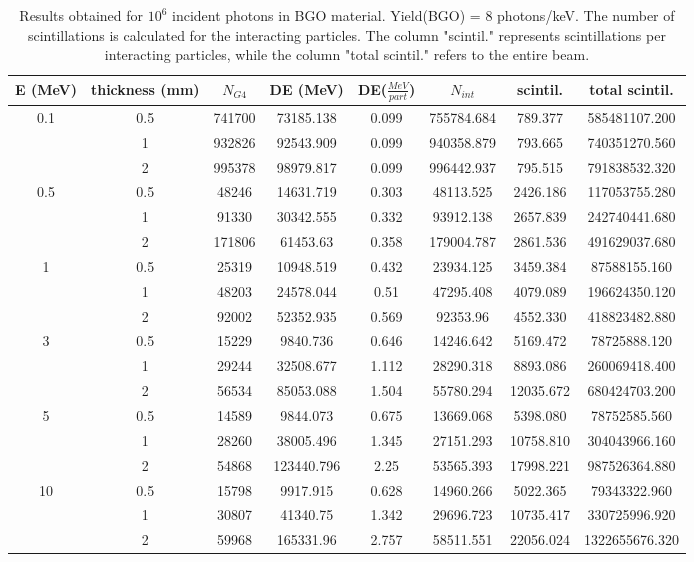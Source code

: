 \documentclass{article}
\begin{document}
\begin{table}[H]
    \centering
    \begin{tabular}{|cccccccc|}
    \hline
        E (MeV) & thickness (mm) & $N_{G4}$ &  DE (MeV) &  DE($\frac{MeV}{part}$)  &  $N_{int}$  &  scintil.  &  total scintil. \\ \hline
         \multirow{3}{*}{0.1} & 0.5 & 741700 & 73185.138 & 0.099 & 755784.684 & 789.377 & 585481107.200 \\ 
         & 1 & 932826 & 92543.909 & 0.099 & 940358.879 & 793.665 & 740351270.560 \\ 
         & 2 & 995378 & 98979.817 & 0.099 & 996442.937 & 795.515 & 791838532.320 \\ \hline
        \multirow{3}{*}{0.5} & 0.5 & 48246 & 14631.719 & 0.303 & 48113.525 & 2426.186 & 117053755.280 \\ 
         & 1 & 91330 & 30342.555 & 0.332 & 93912.138 & 2657.839 & 242740441.680 \\ 
         & 2 & 171806 & 61453.63 & 0.358 & 179004.787 & 2861.536 & 491629037.680 \\ \hline
        \multirow{3}{*}{1} & 0.5 & 25319 & 10948.519 & 0.432 & 23934.125 & 3459.384 & 87588155.160 \\ 
         & 1 & 48203 & 24578.044 & 0.51 & 47295.408 & 4079.089 & 196624350.120 \\ 
         & 2 & 92002 & 52352.935 & 0.569 & 92353.96 & 4552.330 & 418823482.880 \\ \hline
        \multirow{3}{*}{3} & 0.5 & 15229 & 9840.736 & 0.646 & 14246.642 & 5169.472 & 78725888.120 \\ 
         & 1 & 29244 & 32508.677 & 1.112 & 28290.318 & 8893.086 & 260069418.400 \\ 
         & 2 & 56534 & 85053.088 & 1.504 & 55780.294 & 12035.672 & 680424703.200 \\ \hline
        \multirow{3}{*}{5} & 0.5 & 14589 & 9844.073 & 0.675 & 13669.068 & 5398.080 & 78752585.560 \\ 
         & 1 & 28260 & 38005.496 & 1.345 & 27151.293 & 10758.810 & 304043966.160 \\ 
         & 2 & 54868 & 123440.796 & 2.25 & 53565.393 & 17998.221 & 987526364.880 \\ \hline
        \multirow{3}{*}{10} & 0.5 & 15798 & 9917.915 & 0.628 & 14960.266 & 5022.365 & 79343322.960 \\ 
         & 1 & 30807 & 41340.75 & 1.342 & 29696.723 & 10735.417 & 330725996.920 \\ 
         & 2 & 59968 & 165331.96 & 2.757 & 58511.551 & 22056.024 & 1322655676.320 \\ \hline
    \end{tabular}
    \caption{Results obtained for $10^6$ incident photons in BGO material. Yield(BGO) = 8 photons/keV. The number of scintillations is calculated for the interacting particles. The column "scintil." represents scintillations per interacting particles, while the column "total scintil." refers to the entire beam. }
\end{table}
\end{document}
